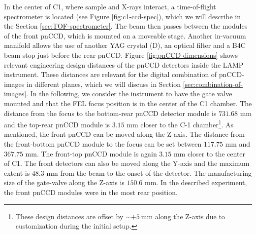 In the center of C1, where sample and X-rays interact, a time-of-flight spectrometer is located (see Figure \ref{fig:c1-ccd-spec}), which we will describe in the Section \ref{sec:TOF-spectrometer}. The beam then passes between the modules of the front pnCCD, which is mounted on a moveable stage. Another in-vacuum manifold allows the use of another YAG crystal (D), an optical filter and a B4C beam stop just before the rear pnCCD. Figure \ref{fig:pnCCD-dimensions} shows relevant engineering design distances of the pnCCD detectors inside the LAMP instrument. These distances are relevant for the digital combination of pnCCD-images in different planes, which we will discuss in Section \ref{sec:combination-of-images}. In the following, we consider the instrument to have the gate valve mounted and that the FEL focus position is in the center of the C1 chamber. The distance from the focus to the bottom-rear pnCCD detector module is $731.68$ mm and the top-rear pnCCD module is $3.15$ mm closer to the C-1 chamber\footnote{These design distances are offset by $\sim +\SI{5}{\milli\meter}$ along the Z-axis due to customization during the initial setup.}. As mentioned, the front pnCCD can be moved along the Z-axis. The distance from the front-bottom pnCCD module to the focus can be set between $117.75$ mm and $367.75$ mm. The front-top pnCCD module is again $3.15$ mm closer to the center of C1. The front detectors can also be moved along the Y-axis and the maximum extent is $48.3$ mm from the beam to the onset of the detector. The manufacturing size of the gate-valve along the Z-axis is $150.6$ mm. In the described experiment, the front pnCCD modules were in the most rear position.\\
%
%
%
